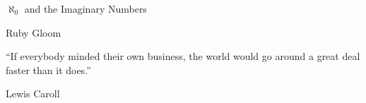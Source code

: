 \begin{BookTitle}
$\aleph_0$ and the Imaginary Numbers
\end{BookTitle}
\begin{Author}
Ruby Gloom
\end{Author}
\begin{Epigraph}
``If everybody minded their own business, the world would go around a great deal faster than it does.''
\end{Epigraph}
\begin{EpigraphSource}
\textemdash{} Lewis Caroll
\end{EpigraphSource}
